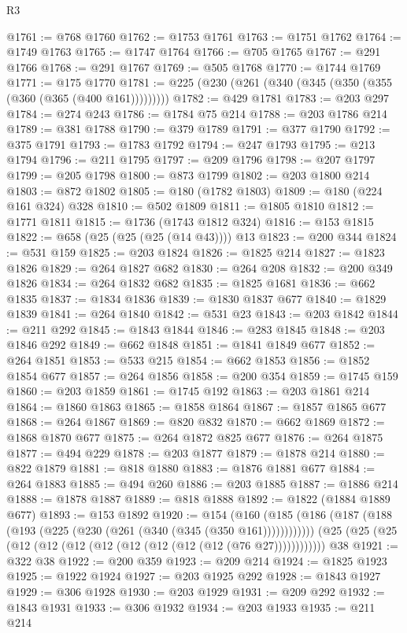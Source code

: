 \begin{lexlean}{R3}
\begin{coremodule}
@1761 := @768 @1760
@1762 := @1753 @1761
@1763 := @1751 @1762
@1764 := @1749 @1763
@1765 := @1747 @1764
@1766 := @705 @1765
@1767 := @291 @1766
@1768 := @291 @1767
@1769 := @505 @1768
@1770 := @1744 @1769
@1771 := @175 @1770
@1781 := @225 (@230 (@261 (@340 (@345 (@350 (@355 (@360 (@365 (@400 @161)))))))))
@1782 := @429 @1781
@1783 := @203 @297
@1784 := @274 @243
@1786 := @1784 @75 @214
@1788 := @203 @1786 @214
@1789 := @381 @1788
@1790 := @379 @1789
@1791 := @377 @1790
@1792 := @375 @1791
@1793 := @1783 @1792
@1794 := @247 @1793
@1795 := @213 @1794
@1796 := @211 @1795
@1797 := @209 @1796
@1798 := @207 @1797
@1799 := @205 @1798
@1800 := @873 @1799
@1802 := @203 @1800 @214
@1803 := @872 @1802
@1805 := @180 (@1782 @1803)
@1809 := @180 (@224 @161 @324) @328
@1810 := @502 @1809
@1811 := @1805 @1810
@1812 := @1771 @1811
@1815 := @1736 (@1743 @1812 @324)
@1816 := @153 @1815
@1822 := @658 (@25 (@25 (@25 (@14 @43)))) @13
@1823 := @200 @344
@1824 := @531 @159
@1825 := @203 @1824
@1826 := @1825 @214
@1827 := @1823 @1826
@1829 := @264 @1827 @682
@1830 := @264 @208
@1832 := @200 @349 @1826
@1834 := @264 @1832 @682
@1835 := @1825 @1681
@1836 := @662 @1835
@1837 := @1834 @1836
@1839 := @1830 @1837 @677
@1840 := @1829 @1839
@1841 := @264 @1840
@1842 := @531 @23
@1843 := @203 @1842
@1844 := @211 @292
@1845 := @1843 @1844
@1846 := @283 @1845
@1848 := @203 @1846 @292
@1849 := @662 @1848
@1851 := @1841 @1849 @677
@1852 := @264 @1851
@1853 := @533 @215
@1854 := @662 @1853
@1856 := @1852 @1854 @677
@1857 := @264 @1856
@1858 := @200 @354
@1859 := @1745 @159
@1860 := @203 @1859
@1861 := @1745 @192
@1863 := @203 @1861 @214
@1864 := @1860 @1863
@1865 := @1858 @1864
@1867 := @1857 @1865 @677
@1868 := @264 @1867
@1869 := @820 @832
@1870 := @662 @1869
@1872 := @1868 @1870 @677
@1875 := @264 @1872 @825 @677
@1876 := @264 @1875
@1877 := @494 @229
@1878 := @203 @1877
@1879 := @1878 @214
@1880 := @822 @1879
@1881 := @818 @1880
@1883 := @1876 @1881 @677
@1884 := @264 @1883
@1885 := @494 @260
@1886 := @203 @1885
@1887 := @1886 @214
@1888 := @1878 @1887
@1889 := @818 @1888
@1892 := @1822 (@1884 @1889 @677)
@1893 := @153 @1892
@1920 := @154
    (@160 (@185 (@186 (@187 (@188 (@193 (@225 (@230 (@261 (@340 (@345 (@350 @161))))))))))))
    (@25 (@25 (@25 (@12 (@12 (@12 (@12 (@12 (@12 (@12 (@12 (@76 @27))))))))))))
    @38
@1921 := @322 @38
@1922 := @200 @359
@1923 := @209 @214
@1924 := @1825 @1923
@1925 := @1922 @1924
@1927 := @203 @1925 @292
@1928 := @1843 @1927
@1929 := @306 @1928
@1930 := @203 @1929
@1931 := @209 @292
@1932 := @1843 @1931
@1933 := @306 @1932
@1934 := @203 @1933
@1935 := @211 @214

\end{coremodule}
\end{lexlean}

